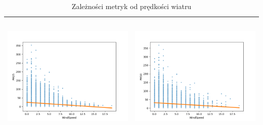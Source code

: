 \documentclass[18pt, letterpaper]{article}
\begin{document}
\begin{table}[H]
\begin{tabular}{|c|c|}
\includegraphics[width=80mm,height=60mm]{visualisations/corr_plots/WindSpeedxPM25_scatter.png}  & \includegraphics[width=80mm,height=60mm]{visualisations/corr_plots/WindSpeedxPM10_scatter.png} \\ \hline
\end{tabular}
\caption{Zależności metryk od prędkości wiatru}
\label{table:wind_speed}
\end{table}
\end{document}
